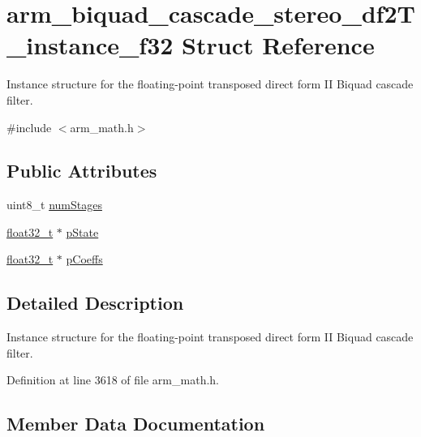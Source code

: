 \hypertarget{structarm__biquad__cascade__stereo__df2_t__instance__f32}{}\section{arm\+\_\+biquad\+\_\+cascade\+\_\+stereo\+\_\+df2\+T\+\_\+instance\+\_\+f32 Struct Reference}
\label{structarm__biquad__cascade__stereo__df2_t__instance__f32}


Instance structure for the floating-\/point transposed direct form II Biquad cascade filter.  




{\ttfamily \#include $<$arm\+\_\+math.\+h$>$}

\subsection*{Public Attributes}
\begin{DoxyCompactItemize}
\item 
uint8\+\_\+t \hyperlink{structarm__biquad__cascade__stereo__df2_t__instance__f32_a5655328252da5c2c2425ceed253bc4f1}{num\+Stages}
\item 
\hyperlink{arm__math_8h_a4611b605e45ab401f02cab15c5e38715}{float32\+\_\+t} $\ast$ \hyperlink{structarm__biquad__cascade__stereo__df2_t__instance__f32_a2cb00048bb1fe957a03c1ff56dfaf8f0}{p\+State}
\item 
\hyperlink{arm__math_8h_a4611b605e45ab401f02cab15c5e38715}{float32\+\_\+t} $\ast$ \hyperlink{structarm__biquad__cascade__stereo__df2_t__instance__f32_a58b15644de62a632c5e9d4a563569dc6}{p\+Coeffs}
\end{DoxyCompactItemize}


\subsection{Detailed Description}
Instance structure for the floating-\/point transposed direct form II Biquad cascade filter. 

Definition at line 3618 of file arm\+\_\+math.\+h.



\subsection{Member Data Documentation}
\mbox{\label{structarm__biquad__cascade__stereo__df2_t__instance__f32_a5655328252da5c2c2425ceed253bc4f1}} 
